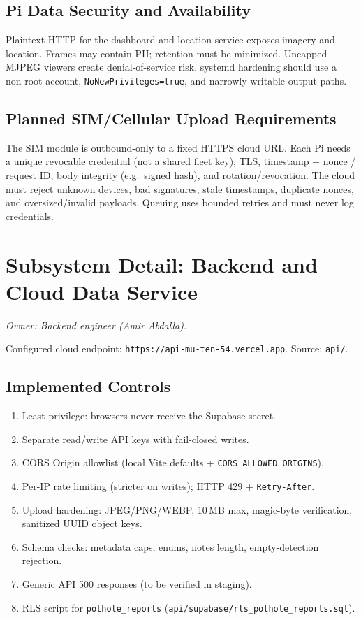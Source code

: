 \documentclass[12pt]{article}
\begin{document}
\subsection{Pi Data Security and Availability}

Plaintext HTTP for the dashboard and location service exposes imagery and
location. Frames may contain PII; retention must be minimized. Uncapped MJPEG
viewers create denial-of-service risk. systemd hardening should use a non-root
account, \texttt{NoNewPrivileges=true}, and narrowly writable output paths.

\subsection{Planned SIM/Cellular Upload Requirements}

The SIM module is outbound-only to a fixed HTTPS cloud URL. Each Pi needs a
unique revocable credential (not a shared fleet key), TLS, timestamp + nonce /
request ID, body integrity (e.g.\ signed hash), and rotation/revocation. The
cloud must reject unknown devices, bad signatures, stale timestamps, duplicate
nonces, and oversized/invalid payloads. Queuing uses bounded retries and must
never log credentials.

\section{Subsystem Detail: Backend and Cloud Data Service}
\label{sec:backend}
\textit{Owner: Backend engineer (Amir Abdalla).}

Configured cloud endpoint: \texttt{https://api-mu-ten-54.vercel.app}. Source:
\texttt{api/}.

\subsection{Implemented Controls}

\begin{enumerate}
    \item Least privilege: browsers never receive the Supabase secret.
    \item Separate read/write API keys with fail-closed writes.
    \item CORS Origin allowlist (local Vite defaults +
          \texttt{CORS\_ALLOWED\_ORIGINS}).
    \item Per-IP rate limiting (stricter on writes); HTTP 429 +
          \texttt{Retry-After}.
    \item Upload hardening: JPEG/PNG/WEBP, 10\,MB max, magic-byte verification,
          sanitized UUID object keys.
    \item Schema checks: metadata caps, enums, notes length, empty-detection
          rejection.
    \item Generic API 500 responses (to be verified in staging).
    \item RLS script for \texttt{pothole\_reports}
          (\texttt{api/supabase/rls\_pothole\_reports.sql}).
\end{enumerate}
\end{document}
